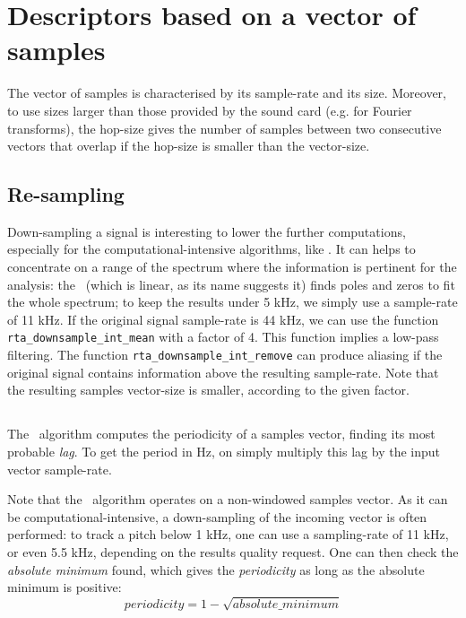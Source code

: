 \documentclass[a4paper, twoside]{article}
\begin{document}
\section{Descriptors based on a vector of samples}
\label{sec:samples_vector_descriptors}

The vector of samples is characterised by its sample-rate and its
size. Moreover, to use sizes larger than those provided by the
sound card (e.g. for Fourier transforms), the hop-size gives the number
of samples between two consecutive vectors that overlap if the hop-size
is smaller than the vector-size.

\subsection{Re-sampling}
\label{sec:resampling}

Down-sampling a signal is interesting to lower the further
computations, especially for the computational-intensive algorithms,
like \yin. It can helps to concentrate on a range of the
spectrum where the information is pertinent for the analysis: the
\lpc\ (which is linear, as its name suggests it) finds poles
and zeros to fit the whole spectrum; to keep the results under 5 kHz,
we simply use a sample-rate of 11 kHz. If the original signal
sample-rate is 44 kHz, we can use the function
\texttt{rta\_downsample\_int\_mean} with a factor of 4. This function
implies a low-pass filtering. The function
\texttt{rta\_downsample\_int\_remove} can produce aliasing if the
original signal contains information above the resulting
sample-rate. Note that the resulting samples vector-size is smaller,
according to the given factor.

\subsection{\Yin}
\label{sec:yin}

The \yin\ algorithm computes the periodicity of a samples
vector, finding its most probable \emph{lag}. To get the period in Hz,
on simply multiply this lag by the input vector sample-rate.

Note that the \yin\ algorithm operates on a non-windowed
samples vector. As it can be computational-intensive, a down-sampling
of the incoming vector is often performed: to track a pitch below 1
kHz, one can use a sampling-rate of 11 kHz, or even 5.5 kHz, depending
on the results quality request. One can then check the \emph{absolute
  minimum} found, which gives the \emph{periodicity} as long as the
absolute minimum is positive:
$$periodicity = 1 - \sqrt{absolute\_minimum}$$
\end{document}
